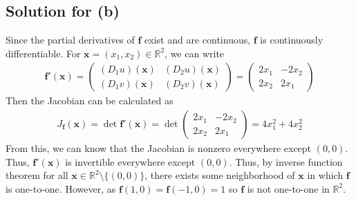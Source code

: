 \documentclass{scrartcl}
\begin{document}
\subsection{Solution for (b)}
Since the partial derivatives of \(\mathbf{f}\) exist and are continuous,
\(\mathbf{f}\) is continuously differentiable. For \(\mathbf{x} = (x_1, x_2)
\in \mathbb{R}^2\), we can write
\begin{align*}
  \mathbf{f}'(\mathbf{x})
  = \begin{pmatrix}
    (D_1 u) (\mathbf{x}) & (D_2 u) (\mathbf{x}) \\
    (D_1 v) (\mathbf{x}) & (D_2 v) (\mathbf{x})
  \end{pmatrix}
  = \begin{pmatrix}
    2x_1 & -2x_2 \\
    2x_2 & 2x_1
  \end{pmatrix}
\end{align*}
Then the Jacobian can be calculated as
\begin{align*}
  J_\mathbf{f}(\mathbf{x})
  = \det \mathbf{f}'(\mathbf{x})
  = \det \begin{pmatrix}
    2x_1 & -2x_2 \\
    2x_2 & 2x_1
  \end{pmatrix}
  = 4x^2_1 + 4x^2_2
\end{align*}
From this, we can know that the Jacobian is nonzero everywhere except \((0,
0)\). Thus, \(\mathbf{f}'(\mathbf{x})\) is invertible everywhere except \((0,
0)\). Thus, by inverse function theorem for all \(\mathbf{x} \in
\mathbb{R}^2 \setminus \{(0, 0)\}\), there exists some neighborhood of
\(\mathbf{x}\) in which \(\mathbf{f}\) is one-to-one. However, as
\(\mathbf{f}(1, 0) = \mathbf{f}(-1, 0) = 1\) so \(\mathbf{f}\) is not
one-to-one in \(\mathbb{R}^2\).
\end{document}
